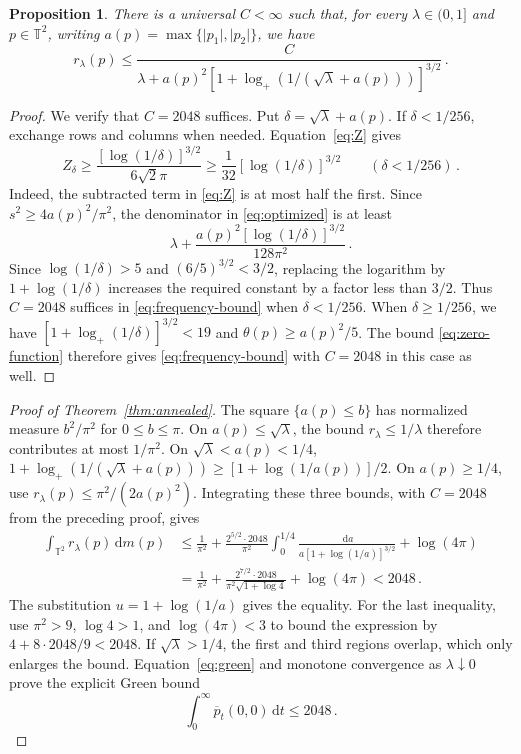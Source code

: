 \documentclass[11pt]{amsart}
\theoremstyle{plain}
\newtheorem{proposition}[theorem]{Proposition}
\theoremstyle{definition}
\newcommand{\T}{\mathbb T}
\newcommand{\1}{\mathbf 1}
\newcommand{\abs}[1]{\lvert #1\rvert}
\newcommand{\dd}{\,\mathrm d}
\begin{document}
\begin{proposition}\label{prop:frequency}
There is a universal $C<\infty$ such that, for every
$\lambda\in(0,1]$ and $p\in\T^2$, writing
$a(p)=\max\{\abs{p_1},\abs{p_2}\}$, we have
\begin{equation}\label{eq:frequency-bound}
  r_\lambda(p)\leq
  \frac{C}{\lambda+a(p)^2
  [1+\log_+(1/(\sqrt\lambda+a(p)))]^{3/2}}\, .
\end{equation}
\end{proposition}

\begin{proof}
We verify that $C=2048$ suffices.  Put $\delta=\sqrt\lambda+a(p)$.
If $\delta<1/256$, exchange rows and columns when needed.
Equation~\eqref{eq:Z} gives
\[
  Z_\delta\geq\frac{[\log(1/\delta)]^{3/2}}{6\sqrt2\pi}
  \geq\frac1{32}[\log(1/\delta)]^{3/2}
  \qquad(\delta<1/256)\, .
\]
Indeed, the subtracted term in \eqref{eq:Z} is at most half the first.
Since $s^2\geq4a(p)^2/\pi^2$, the denominator in
\eqref{eq:optimized} is at least
\[
  \lambda+\frac{a(p)^2[\log(1/\delta)]^{3/2}}{128\pi^2}\, .
\]
Since $\log(1/\delta)>5$ and $(6/5)^{3/2}<3/2$, replacing the
logarithm by $1+\log(1/\delta)$ increases the required constant by a factor
less than $3/2$.
Thus $C=2048$ suffices in \eqref{eq:frequency-bound} when $\delta<1/256$.
When $\delta\geq1/256$, we have
$[1+\log_+(1/\delta)]^{3/2}<19$ and $\theta(p)\geq a(p)^2/5$.
The bound \eqref{eq:zero-function} therefore gives
\eqref{eq:frequency-bound} with $C=2048$ in this case as well.
\end{proof}

\begin{proof}[Proof of Theorem~\ref{thm:annealed}]
The square $\{a(p)\leq b\}$ has normalized measure $b^2/\pi^2$ for
$0\leq b\leq\pi$.  On $a(p)\leq\sqrt\lambda$, the bound
$r_\lambda\leq1/\lambda$ therefore contributes at most $1/\pi^2$.
On $\sqrt\lambda<a(p)<1/4$,
$1+\log_+(1/(\sqrt\lambda+a(p)))\geq[1+\log(1/a(p))]/2$.
On $a(p)\geq1/4$, use $r_\lambda(p)\leq\pi^2/(2a(p)^2)$.
Integrating these three bounds, with $C=2048$ from the preceding proof,
gives
\begin{align*}
  \int_{\T^2}r_\lambda(p)\dd m(p)
  &\leq\frac1{\pi^2}
  +\frac{2^{5/2}\cdot2048}{\pi^2}
    \int_0^{1/4}\frac{\dd a}{a[1+\log(1/a)]^{3/2}}+\log(4\pi)\\
  &=\frac1{\pi^2}
  +\frac{2^{7/2}\cdot2048}{\pi^2\sqrt{1+\log4}}+\log(4\pi)
  <2048\, .
\end{align*}
The substitution $u=1+\log(1/a)$ gives the equality.  For the last
inequality, use $\pi^2>9$, $\log4>1$, and $\log(4\pi)<3$ to bound the
expression by $4+8\cdot2048/9<2048$.
If $\sqrt\lambda>1/4$, the first and third regions overlap, which only
enlarges the bound.  Equation~\eqref{eq:green} and monotone convergence
as $\lambda\downarrow0$ prove the explicit Green bound
\begin{equation}\label{eq:green-explicit}
  \int_0^\infty\overline p_t(0,0)\dd t\leq2048\, .
\end{equation}
\end{proof}
\end{document}
